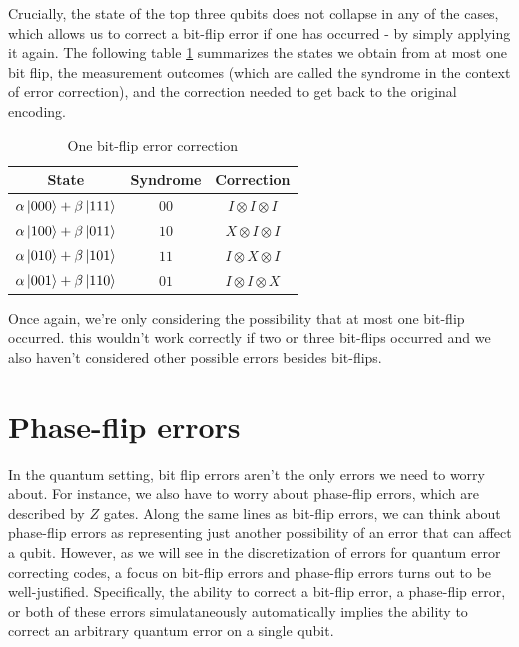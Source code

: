 \documentclass[12pt, oneside]{book}
\theoremstyle{definition}
\theoremstyle{definition}
\theoremstyle{remark}
\begin{document}
Crucially, the state of the top three qubits does not collapse in any of the cases, which allows us to correct a bit-flip error if one has occurred - by simply applying it again. The following table \ref{tab:onebitflip} summarizes the states we obtain from at most one bit flip, the measurement outcomes (which are called the syndrome in the context of error correction), and the correction needed to get back to the original encoding.

\begin{table}
    \centering
    \begin{tabular}{|c|c|c|}
    \hline
        State &  Syndrome & Correction \\
        \hline
         $\alpha\ket{000}+\beta\ket{111}$&$00$  &$I\otimes I\otimes I$ \\
         \hline
         $\alpha\ket{100}+\beta\ket{011}$ & $10$   & $X\otimes I\otimes I$\\
         \hline
         $\alpha\ket{010}+\beta\ket{101}$& $11$ & $I\otimes X\otimes I$\\
         \hline
         $\alpha\ket{001}+\beta\ket{110}$&$01$  &$I\otimes I\otimes X$ \\
         \hline
    \end{tabular}
    \caption{One bit-flip error correction}
    \label{tab:onebitflip}
\end{table}
Once again, we're only considering the possibility that at most one bit-flip occurred. this wouldn't work correctly if two or three bit-flips occurred and we also haven't considered other possible errors besides bit-flips.

\section{Phase-flip errors}
In the quantum setting, bit flip errors aren't the only errors we need to worry about. For instance, we also have to worry about phase-flip errors, which are described by $Z$ gates. Along the same lines as bit-flip errors, we can think about phase-flip errors as representing just another possibility of an error that can affect a qubit. However, as we will see in the discretization of errors for quantum error correcting codes, a focus on bit-flip errors and phase-flip errors turns out to be well-justified. Specifically, the ability to correct a bit-flip error, a phase-flip error, or both of these errors simulataneously automatically implies the ability to correct an arbitrary quantum error on a single qubit.
\end{document}
